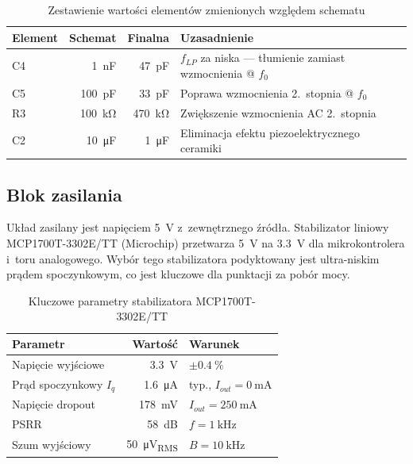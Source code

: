 \documentclass[a4paper,11pt]{article}
\begin{document}
\begin{table}[H]
    \centering
    \caption{Zestawienie wartości elementów zmienionych względem schematu}
    \label{tab:zmienione_wartosci}
    \begin{tabularx}{\textwidth}{l r r X}
        \toprule
        \textbf{Element} & \textbf{Schemat} & \textbf{Finalna} & \textbf{Uzasadnienie} \\
        \midrule
        C4 & \SI{1}{\nano\farad} & \SI{47}{\pico\farad} & $f_{LP}$ za niska --- tłumienie zamiast wzmocnienia @ $f_0$ \\
        C5 & \SI{100}{\pico\farad} & \SI{33}{\pico\farad} & Poprawa wzmocnienia 2.~stopnia @ $f_0$ \\
        R3 & \SI{100}{\kilo\ohm} & \SI{470}{\kilo\ohm} & Zwiększenie wzmocnienia AC 2.~stopnia \\
        C2 & \SI{10}{\micro\farad} & \SI{1}{\micro\farad} & Eliminacja efektu piezoelektrycznego ceramiki \\
        \bottomrule
    \end{tabularx}
\end{table}

\subsection{Blok zasilania}
\label{sec:zasilanie}

Układ zasilany jest napięciem \SI{5}{\volt} z~zewnętrznego źródła.
Stabilizator liniowy MCP1700T-3302E/TT (Microchip) przetwarza
\SI{5}{\volt} na \SI{3,3}{\volt} dla mikrokontrolera i~toru analogowego.
Wybór tego stabilizatora podyktowany jest ultra-niskim prądem spoczynkowym,
co jest kluczowe dla punktacji za pobór mocy.

\begin{table}[H]
    \centering
    \caption{Kluczowe parametry stabilizatora MCP1700T-3302E/TT}
    \label{tab:mcp1700}
    \begin{tabular}{lrl}
        \toprule
        \textbf{Parametr} & \textbf{Wartość} & \textbf{Warunek} \\
        \midrule
        Napięcie wyjściowe & \SI{3,3}{\volt} & $\pm\SI{0,4}{\percent}$ \\
        Prąd spoczynkowy $I_q$ & \SI{1,6}{\micro\ampere} & typ., $I_{out} = \SI{0}{\milli\ampere}$ \\
        Napięcie dropout & \SI{178}{\milli\volt} & $I_{out} = \SI{250}{\milli\ampere}$ \\
        PSRR & \SI{58}{\deci\bel} & $f = \SI{1}{\kilo\hertz}$ \\
        Szum wyjściowy & \SI{50}{\micro\volt_{RMS}} & $B = \SI{10}{\kilo\hertz}$ \\
        \bottomrule
    \end{tabular}
\end{table}
\end{document}
